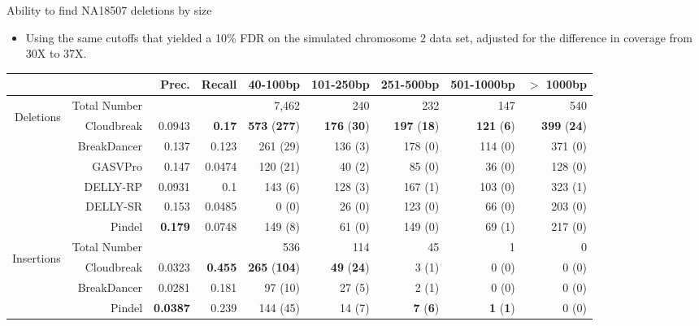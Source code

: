 \documentclass{beamer}
\begin{document}
\begin{frame}{Ability to find NA18507 deletions by size}
\begin{itemize}
\item Using the same cutoffs that yielded a 10\% FDR on the simulated
  chromosome 2 data set, adjusted for the difference in coverage from
  30X to 37X. 
\end{itemize}
\fontsize{6pt}{10}\selectfont
\begin{center}
\begin{tabular}{r|rrr|rrrrr}
  \cline{2-9}
&  & Prec. & Recall & 40-100bp & 101-250bp & 251-500bp & 501-1000bp & $>$ 1000bp \\ 
\hline
\multirow{6}{*}{\begin{sideways}Deletions\end{sideways}} & Total Number & & & 7,462 & 240 & 232 & 147 & 540 \\
  \hline
\cline{2-9}
& Cloudbreak & 0.0943 & \textbf{0.17} & \textbf{573} (\textbf{277})  & \textbf{176} (\textbf{30}) &  \textbf{197} (\textbf{18}) & \textbf{121} (\textbf{6}) & \textbf{399} (\textbf{24}) \\ 
& BreakDancer & 0.137 & 0.123 & 261 (29)  & 136 (3) &  178 (0) & 114 (0) & 371 (0) \\  
&  GASVPro & 0.147 & 0.0474 & 120 (21)  & 40 (2) &  85 (0) & 36 (0) & 128 (0) \\ 
&  DELLY-RP & 0.0931 & 0.1 & 143 (6)  & 128 (3) &  167 (1) & 103 (0) & 323 (1) \\ 
&  DELLY-SR & 0.153 & 0.0485 & 0 (0)  & 26 (0) &  123 (0) & 66 (0) & 203 (0) \\ 
&  Pindel & \textbf{0.179} & 0.0748 & 149 (8)  & 61 (0) &  149 (0) & 69 (1) & 217 (0) \\ 
\hline
\multirow{4}{*}{\begin{sideways}Insertions\end{sideways}} & Total Number & & & 536 & 114 & 45 & 1 & 0 \\
\cline{2-9}
& Cloudbreak & 0.0323 & \textbf{0.455} & \textbf{265} (\textbf{104})  & \textbf{49} (\textbf{24}) &  3 (1) & 0 (0)  & 0 (0)  \\ 
& BreakDancer & 0.0281 & 0.181 & 97 (10)  & 27 (5) &  2 (1) & 0 (0) & 0 (0) \\  
&  Pindel & \textbf{0.0387} & 0.239 & 144 (45)  & 14 (7) &  \textbf{7} (\textbf{6}) & \textbf{1} (\textbf{1}) &  0 (0) \\ 
\hline
\end{tabular}
\end{center}
\end{frame}
\end{document}
